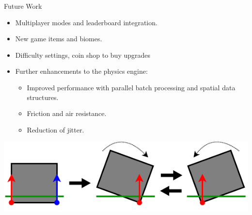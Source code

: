 \begin{frame}{Future Work}
    \begin{itemize}
        \item Multiplayer modes and leaderboard integration.
        \item New game items and biomes.
        \item Difficulty settings, coin shop to buy upgrades
        \item Further enhancements to the physics engine:
        \begin{itemize}
            \item Improved performance with parallel batch processing and spatial data structures.
            \item Friction and air resistance.
            \item Reduction of jitter.
        \end{itemize}
    \end{itemize}
    \centering
    \includegraphics[width = .5\textwidth]{../figures/physics/jitter.pdf}
\end{frame}
